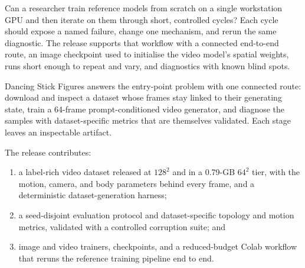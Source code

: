 \documentclass[10pt,twocolumn]{article}
\begin{document}
Can a researcher train reference models from scratch on a single workstation GPU and then iterate on them through
short, controlled cycles? Each cycle should expose a named failure, change one mechanism, and rerun the
same diagnostic. The release supports that workflow with a connected end-to-end route, an image checkpoint
used to initialise the video model's spatial weights, runs short enough to repeat and vary, and diagnostics
with known blind spots.

Dancing Stick Figures answers the entry-point problem with one connected route: download and inspect a
dataset whose frames stay linked to their generating state, train a 64-frame prompt-conditioned video
generator, and diagnose the samples with dataset-specific metrics that are themselves
validated. Each stage leaves an inspectable artifact.

The release contributes:
\begin{enumerate}
\item a label-rich video dataset released at $128^2$ and in a 0.79-GB $64^2$ tier, with the motion, camera,
and body parameters behind every frame, and a deterministic dataset-generation harness;
\item a seed-disjoint evaluation protocol and dataset-specific topology and motion metrics, validated with a
controlled corruption suite; and
\item image and video trainers, checkpoints, and a reduced-budget Colab workflow that reruns the reference
training pipeline end to end.
\end{enumerate}
\end{document}
